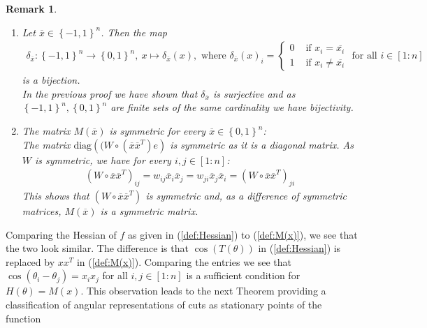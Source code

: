 \documentclass[12pt,a4paper]{article}
\theoremstyle{mythm}
\newtheorem*{rem}{Remark}
\begin{document}
\begin{rem}
\begin{enumerate}
\item 
Let $ \overline{ x } \in \left\{ -1,1 \right\} ^{ n }  $.
Then the map
\begin{align*}
\delta _{ \overline{ x }  }  : \left\{ -1,1 \right\} ^{ n }  \to \left\{ 0,1 \right\} ^{ n }  , \ x \mapsto \delta _{ \overline{ x }  } ( x ), \text{ where }   \delta _{ \overline{ x
} } (x)  _{ i } = \begin{cases}
0 & \text{ if } x_i = \overline{ x_i } \\
1 & \text{ if } x_i \neq \overline{ x_i }  
\end{cases}
\text{ for all } i \in \left[ 1:n \right]   
\end{align*} 
is a bijection. \\
In the previous proof we have shown that $ \delta _{ \overline{ x }  }  $ is surjective and as $ \left\{ -1,1 \right\} ^{ n } , \left\{ 0,1 \right\} ^{ n }  $ are finite sets
of the same cardinality we have bijectivity.
\item The matrix $ M ( \overline{ x } ) $ is symmetric for every $ \overline{ x } \in \left\{ 0,1 \right\} ^{ n }  $: \\
The matrix $ \text{diag} \left( ( W \circ \left( \overline{ x } \overline{ x } ^T  \right) e  \right)  $ is symmetric as it is a diagonal matrix.
As $ W $ is symmetric, we have for every $ i,j \in \left[ 1:n \right]  $:
\begin{align*}
\left( W \circ \overline{ x } \overline{ x } ^T	 \right) _{ ij } = w _{ ij } \overline{ x } _{ i } \overline{ x } _{ j } = w _{ ji } \overline{ x } _{ j } \overline{ x } _{ i
} = \left( W \circ \overline{ x } \overline{ x } ^T  \right) _{ ji } 
\end{align*} 
This shows that $ \left( W \circ \overline{ x } \overline{ x } ^T  \right)  $ is symmetric and, as a difference of symmetric matrices, $ M ( \overline{ x } )  $ is a symmetric
matrix.
\end{enumerate}
\end{rem} 
Comparing the Hessian of $ f $ as given in (\ref{def:Hessian}) to (\ref{def:M(x)}), we see that the two look similar. 
The difference is that $ \cos( T(\theta) )  $ in (\ref{def:Hessian}) is replaced by $ x  x  ^T  $ in (\ref{def:M(x)}). Comparing the entries we see that $
\cos( \theta_i - \theta_j ) = x_i x_j  $ for all $ i,j \in \left[ 1:n \right]  $ is a sufficient condition for $ H(\theta) = M(x) $.
This observation leads to the next Theorem providing a classification of angular representations of cuts as stationary points of the function 
\end{document}
